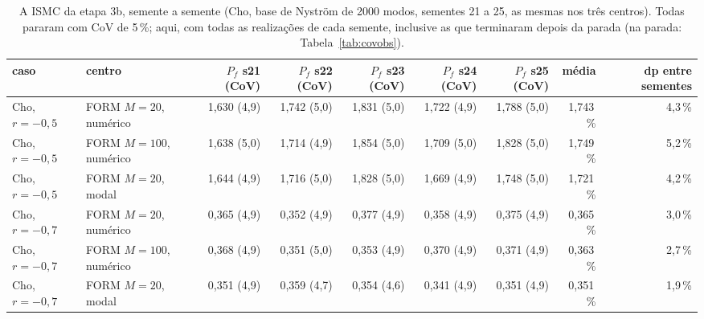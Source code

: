 \begin{landscape}
\begin{table}[H]\centering\small
\caption{A ISMC da etapa 3b, semente a semente (Cho, base de Nyström de 2000 modos, sementes 21 a 25, as mesmas nos três centros). Todas pararam com CoV de 5\,\%; aqui, com todas as realizações de cada semente, inclusive as que terminaram depois da parada (na parada: Tabela~\ref{tab:covobs}).}\label{tab:ismcsem}
\begin{tabular}{llrrrrrrr}\toprule
caso & centro & $P_f$ s21 (CoV) & $P_f$ s22 (CoV) & $P_f$ s23 (CoV) & $P_f$ s24 (CoV) & $P_f$ s25 (CoV) & média & dp entre sementes \\\midrule
Cho, $r = -0{,}5$ & FORM $M = 20$, numérico & 1,630 (4,9) & 1,742 (5,0) & 1,831 (5,0) & 1,722 (4,9) & 1,788 (5,0) & 1,743\,\% & 4,3\,\% \\
Cho, $r = -0{,}5$ & FORM $M = 100$, numérico & 1,638 (5,0) & 1,714 (4,9) & 1,854 (5,0) & 1,709 (5,0) & 1,828 (5,0) & 1,749\,\% & 5,2\,\% \\
Cho, $r = -0{,}5$ & FORM $M = 20$, modal & 1,644 (4,9) & 1,716 (5,0) & 1,828 (5,0) & 1,669 (4,9) & 1,748 (5,0) & 1,721\,\% & 4,2\,\% \\
Cho, $r = -0{,}7$ & FORM $M = 20$, numérico & 0,365 (4,9) & 0,352 (4,9) & 0,377 (4,9) & 0,358 (4,9) & 0,375 (4,9) & 0,365\,\% & 3,0\,\% \\
Cho, $r = -0{,}7$ & FORM $M = 100$, numérico & 0,368 (4,9) & 0,351 (5,0) & 0,353 (4,9) & 0,370 (4,9) & 0,371 (4,9) & 0,363\,\% & 2,7\,\% \\
Cho, $r = -0{,}7$ & FORM $M = 20$, modal & 0,351 (4,9) & 0,359 (4,7) & 0,354 (4,6) & 0,341 (4,9) & 0,351 (4,9) & 0,351\,\% & 1,9\,\% \\
\bottomrule\end{tabular}\end{table}
\end{landscape}
